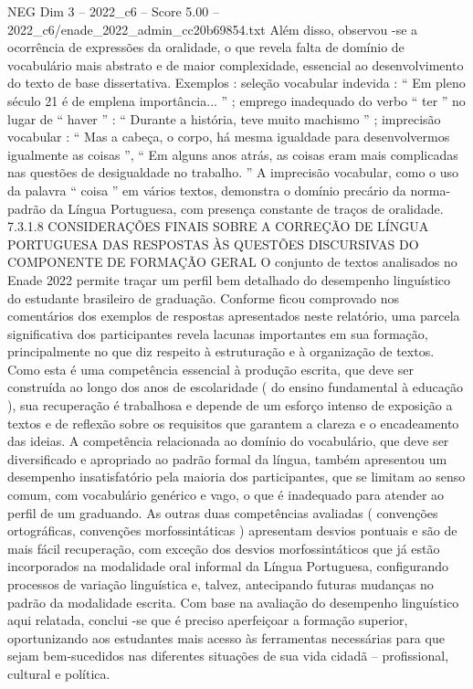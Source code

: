 \begin{textsample}{NEG Dim 3 – 2022\_c6 – Score 5.00 – 2022\_c6/enade\_2022\_admin\_cc20b69854.txt}
Além disso, observou -se a ocorrência de expressões da oralidade, o que revela falta de domínio de vocabulário mais abstrato e de maior complexidade, essencial ao desenvolvimento do texto de base dissertativa.
Exemplos : seleção vocabular indevida : “ Em pleno século 21 é de emplena importância... ” ; emprego inadequado do verbo “ ter ” no lugar de “ haver ” : “ Durante a história, teve muito machismo ” ; imprecisão vocabular : “ Mas a cabeça, o corpo, há mesma igualdade para desenvolvermos igualmente as coisas ”, “ Em alguns anos atrás, as coisas eram mais complicadas nas questões de desigualdade no trabalho. ” A imprecisão vocabular, como o uso da palavra “ coisa ” em vários textos, demonstra o domínio precário da norma-padrão da Língua Portuguesa, com presença constante de traços de oralidade. 7.3.1.8 CONSIDERAÇÕES FINAIS SOBRE A CORREÇÃO DE LÍNGUA PORTUGUESA DAS RESPOSTAS ÀS QUESTÕES DISCURSIVAS DO COMPONENTE DE FORMAÇÃO GERAL O conjunto de textos analisados no Enade 2022 permite traçar um perfil bem detalhado do desempenho linguístico do estudante brasileiro de graduação.
Conforme ficou comprovado nos comentários dos exemplos de respostas apresentados neste relatório, uma parcela significativa dos participantes revela lacunas importantes em sua formação, principalmente no que diz respeito à estruturação e à organização de textos.
Como esta é uma competência essencial à produção escrita, que deve ser construída ao longo dos anos de escolaridade ( do ensino fundamental à educação ), sua recuperação é trabalhosa e depende de um esforço intenso de exposição a textos e de reflexão sobre os requisitos que garantem a clareza e o encadeamento das ideias.
A competência relacionada ao domínio do vocabulário, que deve ser diversificado e apropriado ao padrão formal da língua, também apresentou um desempenho insatisfatório pela maioria dos participantes, que se limitam ao senso comum, com vocabulário genérico e vago, o que é inadequado para atender ao perfil de um graduando.
As outras duas competências avaliadas ( convenções ortográficas, convenções morfossintáticas ) apresentam desvios pontuais e são de mais fácil recuperação, com exceção dos desvios morfossintáticos que já estão incorporados na modalidade oral informal da Língua Portuguesa, configurando processos de variação linguística e, talvez, antecipando futuras mudanças no padrão da modalidade escrita.
Com base na avaliação do desempenho linguístico aqui relatada, conclui -se que é preciso aperfeiçoar a formação superior, oportunizando aos estudantes mais acesso às ferramentas necessárias para que sejam bem-sucedidos nas diferentes situações de sua vida cidadã – profissional, cultural e política.

\end{textsample}
